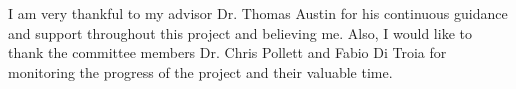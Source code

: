 I am very thankful to my advisor Dr. Thomas Austin for his continuous guidance and support throughout this project and believing me. Also, I would like to thank the committee members Dr. Chris Pollett and Fabio Di Troia for monitoring the progress of the project and their valuable time.